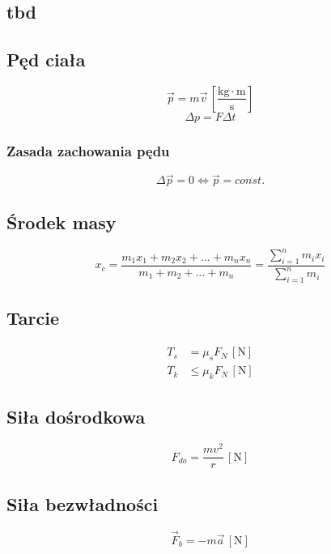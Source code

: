 \documentclass{article}
\numberwithin{equation}{section}
\newcommand{\unit}[1]{\, \left[\mathrm{#1}\right]}
\begin{document}
    \subsection{tbd}
    \subsection{Pęd ciała}
      \begin{equation}
        \vec p = m\vec v \unit{\frac{kg\cdot m}{s}}
      \end{equation}
      \begin{equation}
        \Delta p = F\Delta t
      \end{equation}
      \subsubsection{Zasada zachowania pędu}
        \begin{equation}
          \Delta \vec p = 0 \Leftrightarrow \vec p = const.
        \end{equation}
      \subsection{Środek masy}
        \begin{equation}
          x_c = \frac{m_1x_1+m_2x_2+\dots+m_nx_n}{m_1+m_2+\dots+m_n} =
          \frac{\sum\limits_{i=1}^n m_ix_i}{\sum\limits_{i=1}^n m_i}
        \end{equation}
      \subsection{Tarcie}
        \begin{align}
          T_s &= \mu_sF_N \unit{N}\\
          T_k &\leqslant \mu_kF_N \unit{N}
        \end{align}
      \subsection{Siła dośrodkowa}
        \begin{equation}
          F_{do} = \frac{mv^2}{r} \unit{N}
        \end{equation}
        \subsection{Siła bezwładności}
        \begin{equation}
          \vec F_b = -m\vec a \unit{N}
        \end{equation}
\end{document}

